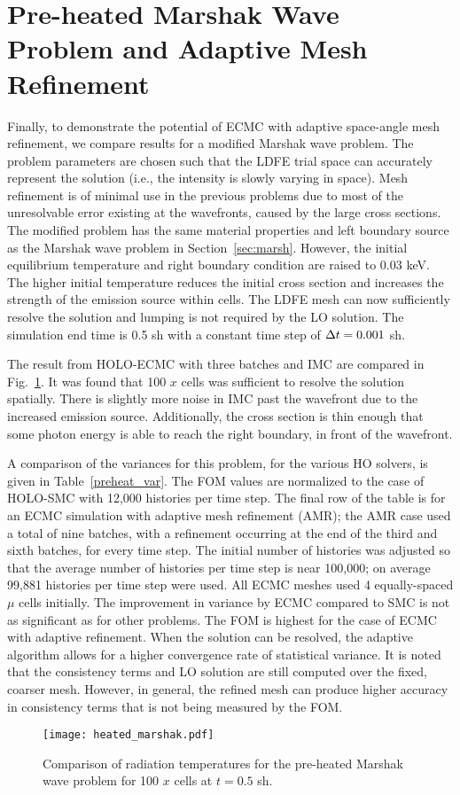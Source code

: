 \section{Pre-heated Marshak Wave Problem and Adaptive Mesh Refinement}

Finally, to demonstrate the potential of ECMC with adaptive space-angle mesh refinement, we compare
results for a modified Marshak wave problem. The problem parameters are chosen such that the LDFE
trial space can accurately represent the solution (i.e., the intensity is slowly varying in space). Mesh refinement is of minimal use in the previous problems due to most of
the unresolvable error existing at the wavefronts, caused by the large cross sections.   The modified problem has the same material
properties and left boundary source as the Marshak wave problem in
Section~\ref{sec:marsh}.  However, the initial equilibrium
temperature and right boundary condition are raised to $0.03$ keV.   The higher initial temperature reduces the
initial cross section and increases the strength of the emission source within cells.  
The LDFE mesh can now sufficiently resolve the solution and lumping is
not required by the LO solution.  The simulation end time is 0.5 sh with a constant
time step of $\Delta t=0.001$ sh.  

The result from HOLO-ECMC with three batches and IMC are compared in Fig.~\ref{hot_plot}.
It was found that 100 $x$ cells was sufficient to resolve the solution spatially. There is slightly more noise in IMC past the wavefront due to the increased emission
source.  Additionally, the cross section is thin enough that some photon energy is able to
reach the right boundary, in front of the wavefront. 

A comparison of the variances for this problem, for the various HO
solvers, is given in Table~\ref{preheat_var}. The FOM values are normalized to the case of HOLO-SMC with 12,000
histories per time step. The final row of the table is for an ECMC simulation with adaptive mesh
refinement (AMR); the AMR case used a total of nine batches, with a refinement occurring at the end
of the third and sixth batches, for every time step. The initial number of histories was adjusted so that
the average number of histories per time step is near 100,000; on average 99,881
histories per time step were used.  All ECMC meshes used 4 equally-spaced $\mu$ cells
initially. 
   The improvement in variance by ECMC compared to SMC is not as significant
as for other problems. The
FOM is highest for the case of ECMC with adaptive refinement. When the solution can
be resolved, the adaptive algorithm allows for a higher convergence rate of
statistical variance.  It is noted that the consistency terms and LO solution are still computed over
the fixed, coarser mesh.  However, in general, the refined mesh can produce higher accuracy in consistency terms that is
not being measured by the FOM.
\begin{figure}[htbp]
  \centering
    \texttt{[image: heated\_marshak.pdf]}
    \caption{\label{hot_plot} Comparison of radiation temperatures for the pre-heated Marshak wave problem for 100
    $x$ cells at ${t=0.5}$ sh.}
\end{figure}


